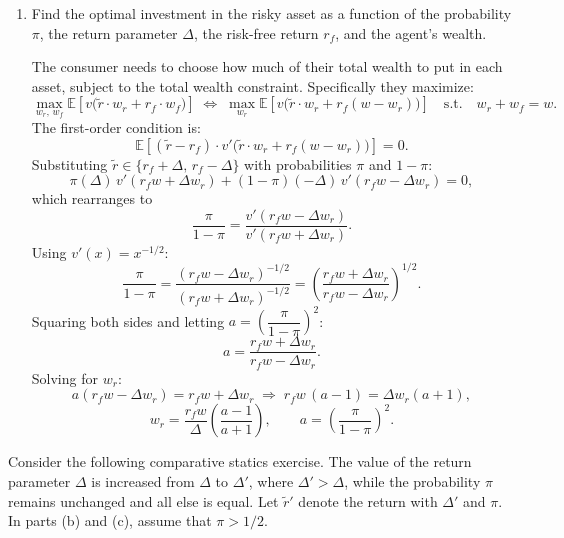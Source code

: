 \documentclass[11pt,english]{article}
\begin{document}
\begin{enumerate}
    \item[(a)] Find the optimal investment in the risky asset as a function of
        the probability $\pi$, the return parameter $\Delta$, the risk-free
        return $r_f$, and the agent's wealth.
    \begin{solution}
 
 The consumer needs to choose how much of their total wealth to put
    in each asset, subject to the total wealth constraint. Specifically they
    maximize:
\[
    \max_{w_r,\, w_f} \mathbb{E}\!\left[v\bigl(\tilde{r}\cdot w_r
    + r_f \cdot w_f\bigr)\right]
    \;\Leftrightarrow\;
    \max_{w_r} \mathbb{E}\!\left[v\bigl(\tilde{r}\cdot w_r
    + r_f(w - w_r)\bigr)\right]
    \quad\text{s.t.}\quad w_r + w_f = w.
\]
The first-order condition is:
\[
    \mathbb{E}\!\left[(\tilde{r} - r_f)\cdot
    v'\!\bigl(\tilde{r}\cdot w_r + r_f(w-w_r)\bigr)\right] = 0.
\]
Substituting $\tilde{r} \in \{r_f + \Delta,\, r_f - \Delta\}$ with
probabilities $\pi$ and $1-\pi$:
\[
    \pi(\Delta)\, v'(r_f w + \Delta w_r)
    + (1-\pi)(-\Delta)\, v'(r_f w - \Delta w_r) = 0,
\]
which rearranges to
\[
    \frac{\pi}{1-\pi}
    = \frac{v'(r_f w - \Delta w_r)}{v'(r_f w + \Delta w_r)}.
\]
Using $v'(x) = x^{-1/2}$:
\[
    \frac{\pi}{1-\pi}
    = \frac{(r_f w - \Delta w_r)^{-1/2}}{(r_f w + \Delta w_r)^{-1/2}}
    = \left(\frac{r_f w + \Delta w_r}{r_f w - \Delta w_r}\right)^{\!1/2}.
\]
Squaring both sides and letting $a = \left(\dfrac{\pi}{1-\pi}\right)^{\!2}$:
\[
    a = \frac{r_f w + \Delta w_r}{r_f w - \Delta w_r}.
\]
Solving for $w_r$:
\[
    a(r_f w - \Delta w_r) = r_f w + \Delta w_r
    \;\Rightarrow\;
    r_f w\,(a-1) = \Delta w_r(a+1),
\]
\[
    \boxed{w_r = \frac{r_f w}{\Delta}\left(\frac{a-1}{a+1}\right),
    \qquad a = \left(\frac{\pi}{1-\pi}\right)^{\!2}.}
\]

    \end{solution}
\end{enumerate}
 
Consider the following comparative statics exercise. The value of the return
parameter $\Delta$ is increased from $\Delta$ to $\Delta'$, where $\Delta' >
\Delta$, while the probability $\pi$ remains unchanged and all else is equal.
Let $\tilde{r}'$ denote the return with $\Delta'$ and $\pi$. In parts (b) and
(c), assume that $\pi > 1/2$.
 
\end{document}
